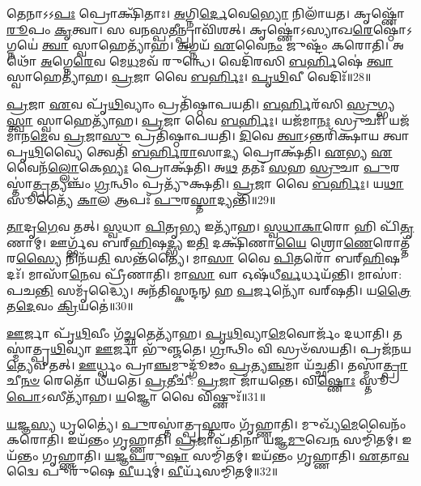 𑌤𑍇𑌨𑌾𑌽𑌽\-\ul{𑌪𑌃} 𑌪𑍍𑌰𑍋𑌕𑍍𑌷𑌿᳴𑌤𑌾𑌃।
\-\ul{𑌅}\-𑌗𑍍𑌨𑌿\-\ul{𑌰𑍍𑌦𑍇}\-𑌵𑍇\-\ul{𑌭𑍍𑌯𑍋} 𑌨𑌿𑌲𑌾᳴𑌯𑌤।
𑌕𑍃𑌷𑍍𑌣𑍋᳴ \ul{𑌰𑍂}\-𑌪𑌂 \ul{𑌕𑍃}\-𑌤𑍍𑌵𑌾।
𑌸 𑌵\-\ul{𑌨}\-𑌸𑍍𑌪\-\ul{𑌤𑍀}\-𑌨𑍍𑌪𑍍𑌰𑌾𑌵𑌿᳴𑌶𑌤𑍍।
𑌕𑍃𑌷𑍍𑌣𑍋॑\-𑌽𑌸𑍍𑌯𑌾𑌖\-\ul{𑌰𑍇}\-𑌷𑍍𑌠𑍋॑\-𑌽𑌗𑍍𑌨𑌯𑍇॑ \ul{𑌤𑍍𑌵𑌾} 𑌸𑍍𑌵𑌾𑌹𑍇𑌤𑍍𑌯𑌾᳴𑌹।
\-\ul{𑌅}\-𑌗𑍍𑌨𑌯᳴ \ul{𑌏}\-𑌵𑍈\-\ul{𑌨𑌂} 𑌜𑍁𑌷𑍍𑌟𑌂᳴ 𑌕𑌰𑍋𑌤𑌿।
𑌅𑌥𑍋᳴ \ul{𑌅}\-𑌗𑍍𑌨𑍇\-\ul{𑌰𑍇}\-𑌵 𑌮𑍇\-\ul{𑌧}\-𑌮𑌵᳴ 𑌰𑍁𑌨𑍍𑌧𑍇।
𑌵𑍇𑌦𑌿᳴𑌰𑌸𑌿 \ul{𑌬}\-\-\ul{𑌰𑍍}\-𑌹𑌿𑌷𑍇॑ \ul{𑌤𑍍𑌵𑌾} 𑌸𑍍𑌵𑌾𑌹𑍇𑌤𑍍𑌯𑌾᳴𑌹।
\-\ul{𑌪𑍍𑌰}\-𑌜𑌾 𑌵𑍈 \ul{𑌬}\-\-\ul{𑌰𑍍}\-𑌹𑌿𑌃।
\-\ul{𑌪𑍃}\-\-\ul{𑌥𑌿}\-𑌵𑍀 𑌵𑍇𑌦𑌿𑌃᳴॥28॥

\-\ul{𑌪𑍍𑌰}\-𑌜𑌾 \ul{𑌏}\-𑌵 𑌪𑍃᳴\-\ul{𑌥𑌿}\-𑌵𑍍𑌯𑌾𑌂 𑌪𑍍𑌰𑌤𑌿᳴\-𑌷𑍍𑌠𑌾𑌪𑌯𑌤𑌿।
\-\ul{𑌬}\-\-\ul{𑌰𑍍}\-𑌹𑌿𑌰᳴𑌸𑌿 \ul{𑌸𑍍𑌰𑍁}\-𑌗𑍍𑌭𑍍𑌯\-\ul{𑌸𑍍𑌤𑍍𑌵𑌾} 𑌸𑍍𑌵𑌾𑌹𑍇𑌤𑍍𑌯𑌾᳴𑌹।
\-\ul{𑌪𑍍𑌰}\-𑌜𑌾 𑌵𑍈 \ul{𑌬}\-\-\ul{𑌰𑍍}\-𑌹𑌿𑌃।
𑌯𑌜᳴𑌮𑌾\-\ul{𑌨𑌃} 𑌸𑍍𑌰𑍁𑌚𑌃᳴।
𑌯𑌜᳴𑌮𑌾𑌨\-\ul{𑌮𑍇}\-𑌵 \ul{𑌪𑍍𑌰}\-𑌜𑌾\-\ul{𑌸𑍁} 𑌪𑍍𑌰𑌤𑌿᳴\-𑌷𑍍𑌠𑌾𑌪𑌯𑌤𑌿।
\-\ul{𑌦𑌿}\-𑌵𑍇 \ul{𑌤𑍍𑌵𑌾}\-\-𑌽𑌨𑍍𑌤𑌰𑌿᳴𑌕𑍍𑌷𑌾𑌯 𑌤𑍍𑌵𑌾 𑌪𑍃\-\ul{𑌥𑌿}\-𑌵𑍍𑌯𑍈 𑌤𑍍𑌵𑍇𑌤𑌿᳴ \ul{𑌬}\-\-\ul{𑌰𑍍}\-𑌹𑌿\-\ul{𑌰𑌾}\-𑌸𑌾\-\ul{𑌦𑍍𑌯} 𑌪𑍍𑌰𑍋𑌕𑍍𑌷᳴𑌤𑌿।
\-\ul{𑌏}\-𑌭𑍍𑌯 \ul{𑌏}\-𑌵𑍈𑌨᳴\-\ul{𑌲𑍍𑌲𑍋}\-𑌕𑍇\-\ul{𑌭𑍍𑌯𑌃} 𑌪𑍍𑌰𑍋𑌕𑍍𑌷᳴𑌤𑌿।
𑌅\-\ul{𑌥} 𑌤𑌤𑌃᳴ \ul{𑌸}\-𑌹 \ul{𑌸𑍍𑌰𑍁}\-𑌚𑌾 \ul{𑌪𑍁}\-𑌰𑌸𑍍𑌤𑌾॑\-\ul{𑌤𑍍𑌪𑍍𑌰}\-𑌤𑍍𑌯𑌞𑍍𑌚𑌂᳴ \ul{𑌗𑍍𑌰}\-𑌨𑍍𑌥𑌿𑌂 𑌪𑍍𑌰𑌤𑍍𑌯𑍁᳴𑌕𑍍𑌷𑌤𑌿।
\-\ul{𑌪𑍍𑌰}\-𑌜𑌾 𑌵𑍈 \ul{𑌬}\-\-\ul{𑌰𑍍}\-𑌹𑌿𑌃।
𑌯\-\ul{𑌥𑌾} 𑌸𑍂𑌤𑍍𑌯𑍈᳴ \ul{𑌕𑌾}\-𑌲 𑌆𑌪𑌃᳴ \ul{𑌪𑍁}\-𑌰\-\ul{𑌸𑍍𑌤𑌾}\-𑌦𑍍𑌯𑌨𑍍𑌤𑌿᳴॥29॥

\-\ul{𑌤𑌾}\-𑌦𑍃\-\ul{𑌗𑍇}\-𑌵 𑌤𑌤𑍍।
\-\ul{𑌸𑍍𑌵}\-𑌧𑌾 \ul{𑌪𑌿}\-𑌤𑍃\-\ul{𑌭𑍍𑌯} 𑌇𑌤𑍍𑌯𑌾᳴𑌹।
\-\ul{𑌸𑍍𑌵}\-\-\ul{𑌧𑌾}\-\-\ul{𑌕𑌾}\-𑌰𑍋 𑌹𑌿 𑌪𑌿᳴\-\ul{𑌤𑍃}\-𑌣𑌾𑌮𑍍।
𑌊𑌰𑍍𑌗𑍍𑌭᳴𑌵 𑌬𑌰𑍍‌\mbox{}\-\ul{𑌹𑌿}\-𑌷\-\ul{𑌦𑍍𑌭𑍍𑌯} 𑌇\-\ul{𑌤𑌿} 𑌦𑌕𑍍𑌷𑌿᳴𑌣𑌾\-\ul{𑌯𑍈} 𑌶𑍍𑌰𑍋\-\ul{𑌣𑍇}\-𑌰𑍋𑌤𑍍𑌤᳴𑌰\-\ul{𑌸𑍍𑌯𑍈} 𑌨𑌿𑌨᳴𑌯\-\ul{𑌤𑌿} 𑌸𑌨𑍍𑌤᳴𑌤𑍍𑌯𑍈।
𑌮𑌾\-\ul{𑌸𑌾} 𑌵𑍈 \ul{𑌪𑌿}\-𑌤𑌰𑍋᳴ 𑌬𑌰𑍍‌\mbox{}\-\ul{𑌹𑌿}\-𑌷𑌦𑌃᳴।
𑌮𑌾𑌸𑌾᳴\-\ul{𑌨𑍇}\-𑌵 𑌪𑍍𑌰𑍀᳴𑌣𑌾𑌤𑌿।
𑌮𑌾\-\ul{𑌸𑌾} 𑌵𑌾 𑌓𑌷᳴𑌧𑍀\-\ul{𑌰𑍍𑌵}\-𑌰𑍍𑌧𑌯᳴𑌨𑍍𑌤𑌿।
𑌮𑌾𑌸𑌾॑: 𑌪𑌚\-\ul{𑌨𑍍𑌤𑌿} 𑌸𑌮𑍃᳴𑌦𑍍𑌧𑍍𑌯𑍈।
𑌅𑌨᳴𑌤𑌿𑌸𑍍𑌕𑌨𑍍𑌦𑌨𑍍 𑌹 \ul{𑌪}\-𑌰𑍍𑌜𑌨𑍍𑌯𑍋᳴ 𑌵𑌰𑍍‌\mbox{}𑌷𑌤𑌿।
𑌯\-\ul{𑌤𑍍𑌰𑍈}\-𑌤\-\ul{𑌦𑍇}\-𑌵𑌂 \ul{𑌕𑍍𑌰𑌿}\-𑌯𑌤𑍇॑॥30॥

\-\ul{𑌊}\-𑌰𑍍𑌜𑌾 𑌪𑍃᳴\-\ul{𑌥𑌿}\-𑌵𑍀𑌂 𑌗᳴\-\ul{𑌚𑍍𑌛}\-𑌤𑍇𑌤𑍍𑌯𑌾᳴𑌹।
\-\ul{𑌪𑍃}\-\-\ul{𑌥𑌿}\-𑌵𑍍𑌯𑌾\-\ul{𑌮𑍇}\-𑌵𑍋𑌰𑍍𑌜𑌂᳴ 𑌦𑌧𑌾𑌤𑌿।
𑌤𑌸𑍍𑌮𑌾॑𑌤𑍍𑌪𑍃\-\ul{𑌥𑌿}\-𑌵𑍍𑌯𑌾 \ul{𑌊}\-𑌰𑍍𑌜𑌾 𑌭𑍁᳴𑌞𑍍𑌜𑌤𑍇।
\-\ul{𑌗𑍍𑌰}\-𑌨𑍍𑌥𑌿𑌂 𑌵𑌿 𑌸𑍍𑌰𑍞᳴𑌸𑌯𑌤𑌿।
𑌪𑍍𑌰𑌜᳴𑌨𑌯\-\ul{𑌤𑍍𑌯𑍇}\-𑌵 𑌤𑌤𑍍।
\-\ul{𑌊}\-𑌰𑍍𑌧𑍍𑌵𑌂 𑌪𑍍𑌰𑌾\-\ul{𑌞𑍍𑌚}\-𑌮𑍁𑌦𑍍𑌗𑍂᳴𑌢𑌂 \ul{𑌪𑍍𑌰}\-𑌤𑍍𑌯\-\ul{𑌞𑍍𑌚}\-𑌮𑌾 𑌯᳴𑌚𑍍𑌛𑌤𑌿।
𑌤𑌸𑍍𑌮𑌾॑\-\ul{𑌤𑍍𑌪𑍍𑌰𑌾}\-𑌚𑍀\-\ul{𑌨}\-\-\ul{𑍞} 𑌰𑍇𑌤𑍋᳴ 𑌧𑍀𑌯𑌤𑍇।
\-\ul{𑌪𑍍𑌰}\-𑌤𑍀𑌚𑍀॑: \ul{𑌪𑍍𑌰}\-𑌜𑌾 𑌜𑌾᳴𑌯𑌨𑍍𑌤𑍇।
𑌵𑌿\-\ul{𑌷𑍍𑌣𑍋𑌃} 𑌸𑍍𑌤𑍂\-\ul{𑌪𑍋}\-\-𑌽𑌸𑍀𑌤𑍍𑌯𑌾᳴𑌹।
\-\ul{𑌯}\-𑌜𑍍𑌞𑍋 𑌵𑍈 𑌵𑌿𑌷𑍍𑌣𑍁𑌃᳴॥31॥

\-\ul{𑌯}\-𑌜𑍍𑌞\-\ul{𑌸𑍍𑌯} 𑌧𑍃𑌤𑍍𑌯𑍈॑।
\-\ul{𑌪𑍁}\-𑌰𑌸𑍍𑌤𑌾॑𑌤𑍍𑌪𑍍𑌰\-\ul{𑌸𑍍𑌤}\-𑌰𑌂 𑌗𑍃᳴𑌹𑍍𑌣𑌾𑌤𑌿।
𑌮𑍁𑌖𑍍𑌯᳴\-\ul{𑌮𑍇}\-𑌵𑍈𑌨𑌂᳴ 𑌕𑌰𑍋𑌤𑌿।
𑌇𑌯᳴𑌨𑍍𑌤𑌂 𑌗𑍃𑌹𑍍𑌣𑌾𑌤𑌿।
\-\ul{𑌪𑍍𑌰}\-𑌜𑌾𑌪᳴𑌤𑌿𑌨𑌾 𑌯𑌜𑍍𑌞\-\ul{𑌮𑍁}\-𑌖𑍇\-\ul{𑌨} 𑌸𑌮𑍍𑌮𑌿᳴𑌤𑌮𑍍।
𑌇𑌯᳴𑌨𑍍𑌤𑌂 𑌗𑍃𑌹𑍍𑌣𑌾𑌤𑌿।
\-\ul{𑌯}\-\-\ul{𑌜𑍍𑌞}\-\-\ul{𑌪}\-𑌰𑍁\-\ul{𑌷𑌾} 𑌸𑌮𑍍𑌮𑌿᳴𑌤𑌮𑍍।
𑌇𑌯᳴𑌨𑍍𑌤𑌂 𑌗𑍃𑌹𑍍𑌣𑌾𑌤𑌿।
\-\ul{𑌏}\-𑌤𑌾\-\ul{𑌵}\-𑌦𑍍𑌵𑍈 𑌪𑍁𑌰𑍁᳴𑌷𑍇 \ul{𑌵𑍀}\-𑌰𑍍𑌯𑌮𑍍॑।
\-\ul{𑌵𑍀}\-𑌰𑍍𑌯᳴𑌸𑌮𑍍𑌮𑌿𑌤𑌮𑍍॥32॥

